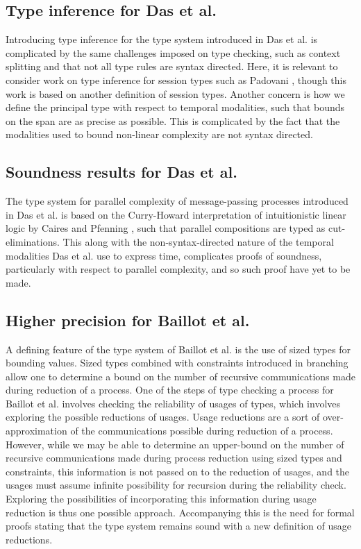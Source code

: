 \subsection*{Type inference for Das et al.}
Introducing type inference for the type system introduced in Das et al. \cite{DasEtAl2018} is complicated by the same challenges imposed on type checking, such as context splitting and that not all type rules are syntax directed. Here, it is relevant to consider work on type inference for session types such as Padovani \cite{Padovani2017}, though this work is based on another definition of session types. Another concern is how we define the principal type with respect to temporal modalities, such that bounds on the span are as precise as possible. This is complicated by the fact that the modalities used to bound non-linear complexity are not syntax directed.

\subsection*{Soundness results for Das et al.}
The type system for parallel complexity of message-passing processes introduced in Das et al. \cite{DasEtAl2018} is based on the Curry-Howard interpretation of intuitionistic linear logic by Caires and Pfenning \cite{CairesPfenning2010}, such that parallel compositions are typed as cut-eliminations. This along with the non-syntax-directed nature of the temporal modalities Das et al. use to express time, complicates proofs of soundness, particularly with respect to parallel complexity, and so such proof have yet to be made.

\subsection*{Higher precision for Baillot et al.}
A defining feature of the type system of Baillot et al. \cite{BaillotEtAl2021} is the use of sized types for bounding values. Sized types combined with constraints introduced in branching allow one to determine a bound on the number of recursive communications made during reduction of a process. One of the steps of type checking a process for Baillot et al. involves checking the reliability of usages of types, which involves exploring the possible reductions of usages. Usage reductions are a sort of over-approximation of the communications possible during reduction of a process. However, while we may be able to determine an upper-bound on the number of recursive communications made during process reduction using sized types and constraints, this information is not passed on to the reduction of usages, and the usages must assume infinite possibility for recursion during the reliability check. Exploring the possibilities of incorporating this information during usage reduction is thus one possible approach. Accompanying this is the need for formal proofs stating that the type system remains sound with a new definition of usage reductions.

